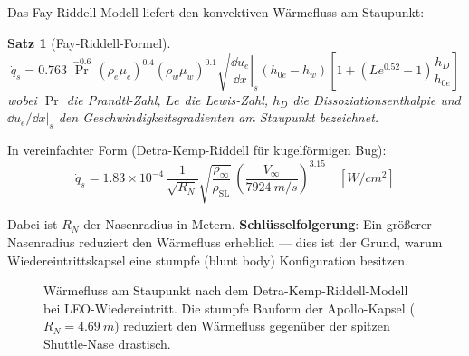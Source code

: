 ﻿\documentclass[12pt,a4paper]{article}
\newtheorem{satz}{Satz}[section]
\begin{document}
Das Fay-Riddell-Modell liefert den konvektiven Wärmefluss am Staupunkt:

\begin{satz}[Fay-Riddell-Formel]
\[
  \dot{q}_s = 0.763\,\Pr^{-0.6}\,
    \left(\rho_e \mu_e\right)^{0.4}
    \left(\rho_w \mu_w\right)^{0.1}
    \sqrt{\left.\frac{\dd u_e}{\dd x}\right|_s}
    \left(h_{0e} - h_w\right)
    \left[1 + (Le^{0.52}-1)\frac{h_D}{h_{0e}}\right]
\]
wobei $\Pr$ die Prandtl-Zahl, $Le$ die Lewis-Zahl, $h_D$ die
Dissoziationsenthalpie und $\dd u_e/\dd x|_s$ den Geschwindigkeitsgradienten
am Staupunkt bezeichnet.
\end{satz}

In vereinfachter Form (Detra-Kemp-Riddell für kugelförmigen Bug):
\[
  \dot{q}_s = 1.83\times10^{-4}\,\frac{1}{\sqrt{R_N}}
    \sqrt{\frac{\rho_\infty}{\rho_{\mathrm{SL}}}}\,
    \left(\frac{V_\infty}{\SI{7924}{m/s}}\right)^{3.15}
    \quad [\si{W/cm^2}]
\]

Dabei ist $R_N$ der Nasenradius in Metern. \textbf{Schlüsselfolgerung}: Ein
größerer Nasenradius reduziert den Wärmefluss erheblich --- dies ist der Grund,
warum Wiedereintrittskapsel eine stumpfe (blunt body) Konfiguration besitzen.

\begin{figure}[H]
\centering
{}
\caption{Wärmefluss am Staupunkt nach dem Detra-Kemp-Riddell-Modell bei LEO-Wiedereintritt.
Die stumpfe Bauform der Apollo-Kapsel ($R_N = \SI{4.69}{m}$) reduziert den Wärmefluss
gegenüber der spitzen Shuttle-Nase drastisch.}
\label{fig:waermefluss}
\end{figure}
\end{document}

